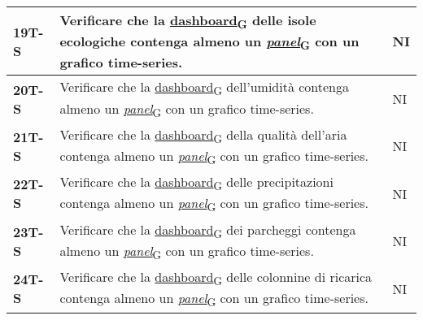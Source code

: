 \begin{longtable}{|>{\raggedright\arraybackslash}m{}|>{\raggedright\arraybackslash}m{}|>{\raggedright\arraybackslash}m{}|}
	\hline
	\textbf{19T-S}  & Verificare che la \href{https://7last.github.io/docs/rtb/documentazione-interna/glossario\#dashboard}{dashboard\textsubscript{G}} delle isole ecologiche contenga almeno un \href{https://7last.github.io/docs/rtb/documentazione-interna/glossario\#panel}{\textit{panel}\textsubscript{G}} con un grafico time-series.                                                                                 & NI             \\
	\hline
	\textbf{20T-S}  & Verificare che la \href{https://7last.github.io/docs/rtb/documentazione-interna/glossario\#dashboard}{dashboard\textsubscript{G}} dell'umidità contenga almeno un \href{https://7last.github.io/docs/rtb/documentazione-interna/glossario\#panel}{\textit{panel}\textsubscript{G}} con un grafico time-series.                                                                                           & NI             \\
	\hline
	\textbf{21T-S}  & Verificare che la \href{https://7last.github.io/docs/rtb/documentazione-interna/glossario\#dashboard}{dashboard\textsubscript{G}} della qualità dell'aria contenga almeno un \href{https://7last.github.io/docs/rtb/documentazione-interna/glossario\#panel}{\textit{panel}\textsubscript{G}} con un grafico time-series.                                                                                & NI             \\
	\hline
	\textbf{22T-S}  & Verificare che la \href{https://7last.github.io/docs/rtb/documentazione-interna/glossario\#dashboard}{dashboard\textsubscript{G}} delle precipitazioni contenga almeno un \href{https://7last.github.io/docs/rtb/documentazione-interna/glossario\#panel}{\textit{panel}\textsubscript{G}} con un grafico time-series.                                                                                   & NI             \\
	\hline
	\textbf{23T-S}  & Verificare che la \href{https://7last.github.io/docs/rtb/documentazione-interna/glossario\#dashboard}{dashboard\textsubscript{G}} dei parcheggi contenga almeno un \href{https://7last.github.io/docs/rtb/documentazione-interna/glossario\#panel}{\textit{panel}\textsubscript{G}} con un grafico time-series.                                                                                          & NI             \\
	\hline
	\textbf{24T-S}  & Verificare che la \href{https://7last.github.io/docs/rtb/documentazione-interna/glossario\#dashboard}{dashboard\textsubscript{G}} delle colonnine di ricarica contenga almeno un \href{https://7last.github.io/docs/rtb/documentazione-interna/glossario\#panel}{\textit{panel}\textsubscript{G}} con un grafico time-series.                                                                            & NI             \\

\end{longtable}
